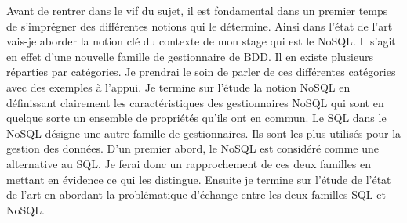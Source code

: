 Avant de rentrer dans le vif du sujet, il est fondamental dans un
premier temps de s'imprégner des différentes notions qui le détermine.
Ainsi dans l'état de l'art vais-je aborder la notion clé du contexte de
mon stage qui est le \textsf{NoSQL}. Il s'agit en effet d'une nouvelle
famille de gestionnaire de \textsf{BDD}. Il en existe plusieurs réparties 
par catégories. Je prendrai le soin de parler de ces différentes
catégories avec des exemples à l'appui. 
Je termine sur l'étude la notion \textsf{NoSQL} en définissant clairement les
caractéristiques des gestionnaires \textsf{NoSQL} qui sont en quelque
sorte un ensemble de propriétés qu'ils ont en commun. Le \textsf{SQL}
dans le \textsf{NoSQL} désigne une autre famille de gestionnaires.
Ils sont les plus utilisés pour la gestion des données. D'un premier
abord, le \textsf{NoSQL} est considéré comme une alternative
au \textsf{SQL}. Je ferai donc un rapprochement de ces deux
familles en mettant en évidence ce qui les distingue. Ensuite je termine
sur l'étude de l'état de l'art en abordant la problématique d'échange entre 
les deux familles
\textsf{SQL} et \textsf{NoSQL}.


